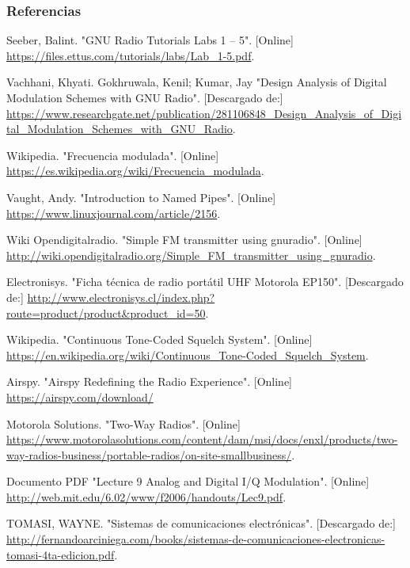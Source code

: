 \begin{frame}[allowframebreaks]
\frametitle{Referencias}



\begin{thebibliography}{11}







 Seeber, Balint.
\newblock "GNU Radio Tutorials Labs 1 – 5". [Online] \url{https://files.ettus.com/tutorials/labs/Lab\_1-5.pdf}. 

 Vachhani, Khyati. Gokhruwala, Kenil; Kumar, Jay  
\newblock "Design Analysis of Digital Modulation Schemes with GNU Radio". [Descargado de:] \url{https://www.researchgate.net/publication/281106848_Design_Analysis_of_Digital_Modulation_Schemes_with_GNU_Radio}. 

 Wikipedia.
\newblock "Frecuencia modulada". [Online] \url{https://es.wikipedia.org/wiki/Frecuencia_modulada}. 

 Vaught, Andy.
\newblock "Introduction to Named Pipes". [Online] \url{https://www.linuxjournal.com/article/2156}. 

 Wiki Opendigitalradio.
\newblock "Simple FM transmitter using gnuradio". [Online] \url{http://wiki.opendigitalradio.org/Simple_FM_transmitter_using_gnuradio}. 


 Electronisys.
\newblock "Ficha técnica de radio portátil UHF Motorola EP150". [Descargado de:] \url{http://www.electronisys.cl/index.php?route=product/product&product\_id=50}. 

 Wikipedia.
\newblock "Continuous Tone-Coded Squelch System". [Online] \url{https://en.wikipedia.org/wiki/Continuous\_Tone-Coded\_Squelch\_System}. 

 Airspy.
\newblock "Airspy Redefining the Radio Experience". [Online] \url{https://airspy.com/download/}

 Motorola Solutions.
\newblock "Two-Way Radios". [Online] \url{https://www.motorolasolutions.com/content/dam/msi/docs/enxl/products/two-way-radios-business/portable-radios/on-site-smallbusiness/}. 

 Documento PDF
\newblock "Lecture 9 Analog and Digital I/Q Modulation". [Online] \url{http://web.mit.edu/6.02/www/f2006/handouts/Lec9.pdf}.


 TOMASI, WAYNE.
\newblock "Sistemas de comunicaciones electrónicas". [Descargado de:] \url{http://fernandoarciniega.com/books/sistemas-de-comunicaciones-electronicas-tomasi-4ta-edicion.pdf}.




\end{thebibliography}


\end{frame}